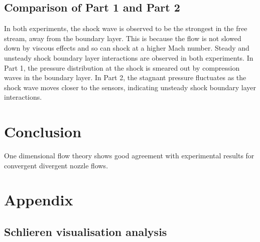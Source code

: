 \documentclass{article}
\begin{document}
\subsection{Comparison of Part 1 and Part 2}

In both experiments, the shock wave is observed to be the strongest in the free stream, away from the boundary layer.
This is because the flow is not slowed down by viscous effects and so can shock at a higher Mach number.
Steady and unsteady shock boundary layer interactions are observed in both experiments.
In Part 1, the pressure distribution at the shock is smeared out by compression waves in the boundary layer.
In Part 2, the stagnant pressure fluctuates as the shock wave moves closer to the sensors, indicating unsteady shock boundary layer interactions.


\section{Conclusion}


One dimensional flow theory shows good agreement with experimental results for convergent divergent nozzle flows.



\iftrue

\newpage
\section{Appendix}

\subsection{Schlieren visualisation analysis}
\end{document}
